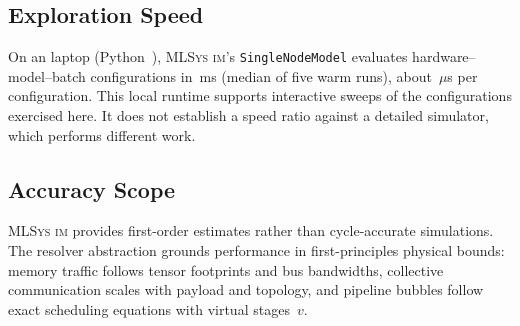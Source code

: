 \documentclass[10pt,twocolumn]{article}
\newcommand{\mlsysim}{\mbox{\textsc{MLSys}\,\textperiodcentered\,\textsc{im}}\xspace}
\begin{document}
\subsection{Exploration Speed}
\label{sec:validation-speed}

On an \MachineCpu{} laptop (Python~\MachinePython), \mlsysim's \texttt{SingleNodeModel} evaluates \SweepTimingConfigs{} hardware--model--batch configurations in \SweepTimingMedianMs\,ms (median of five warm runs), about \SweepTimingPerConfigUs\,$\mu$s per configuration. This local runtime supports interactive sweeps of the configurations exercised here. It does not establish a speed ratio against a detailed simulator, which performs different work.

\subsection{Accuracy Scope}
\label{sec:accuracy}

\mlsysim provides first-order estimates rather than cycle-accurate simulations. The resolver abstraction grounds performance in first-principles physical bounds: memory traffic follows tensor footprints and bus bandwidths, collective communication scales with payload and topology, and pipeline bubbles follow exact scheduling equations with virtual stages~$v$.
\end{document}
